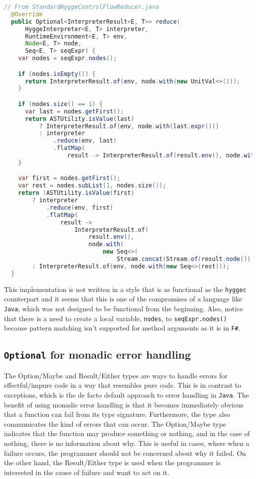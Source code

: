 \begin{lstlisting}[language=Java]
  // From StandardHyggeControlFlowReducer.java
  @Override
  public Optional<InterpreterResult<E, T>> reduce(
      HyggeInterpreter<E, T> interpreter,
      RuntimeEnvironment<E, T> env,
      Node<E, T> node,
      Seq<E, T> seqExpr) {
    var nodes = seqExpr.nodes();

    if (nodes.isEmpty()) {
      return InterpreterResult.of(env, node.with(new UnitVal<>()));
    }

    if (nodes.size() == 1) {
      var last = nodes.getFirst();
      return ASTUtility.isValue(last)
          ? InterpreterResult.of(env, node.with(last.expr()))
          : interpreter
              .reduce(env, last)
              .flatMap(
                  result -> InterpreterResult.of(result.env(), node.with(result.node().expr())));
    }

    var first = nodes.getFirst();
    var rest = nodes.subList(1, nodes.size());
    return !ASTUtility.isValue(first)
        ? interpreter
            .reduce(env, first)
            .flatMap(
                result ->
                    InterpreterResult.of(
                        result.env(),
                        node.with(
                            new Seq<>(
                                Stream.concat(Stream.of(result.node()), rest.stream()).toList()))))
        : InterpreterResult.of(env, node.with(new Seq<>(rest)));
  }
\end{lstlisting}

This implementation is not written in a style that is as functional as the \texttt{hyggec} counterpart and it seems that
this is one of the compromises of a language like \texttt{Java}, which was not designed to be functional from the beginning.
Also, notice that there is a need to create a local variable, \texttt{nodes}, to \texttt{seqExpr.nodes()} because pattern
matching isn't supported for method arguments as it is in \texttt{F\#}.

\subsection{\texttt{Optional} for monadic error handling}

The Option/Maybe and Result/Either types are ways to handle errors for effectful/impure code in a way that resembles pure code.
This is in contrast to exceptions, which is the de facto default approach to error handling in \texttt{Java}. The benefit
of using monadic error handling is that it becomes immediately obvious that a function can fail from its type signature.
Furthermore, the type also communicates the kind of errors that can occur. The Option/Maybe type indicates that the function
may produce something or nothing, and in the case of nothing, there is no information about why. This is useful in cases,
where when a failure occurs, the programmer should not be concerned about why it failed. On the other hand, the Result/Either
type is used when the programmer is interested in the cause of failure and want to act on it.

